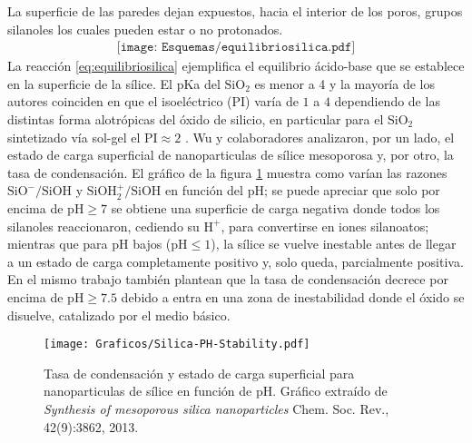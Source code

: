 	La superficie de las paredes dejan expuestos, hacia el interior de los poros, grupos silanoles los cuales pueden estar o no protonados.\cite{Brinker1990,Soler-Illia2011} 
			\begin{equation}
				\begin{aligned}
				\texttt{[image: Esquemas/equilibriosilica.pdf]}
				\label{eq:equilibriosilica}
				\end{aligned}
				\end{equation}
	La reacción \ref{eq:equilibriosilica} ejemplifica el equilibrio ácido-base que se establece en la superficie de la sílice. El pKa del $\text{SiO}_2$ es menor a 4 y la mayoría de los autores coinciden en que el isoeléctrico (PI) varía de $1$ a $4$ dependiendo de  las distintas forma alotrópicas del óxido de silicio, en particular para el SiO$_2$ sintetizado vía sol-gel el $\text{PI}\approx 2$ \cite{Kosmulski2002,Kosmulski2014,Schwarz1984,Si-HanWu2013}.
	Wu y colaboradores\cite{Si-HanWu2013} analizaron, por un lado, el estado de carga superficial de nanoparticulas de sílice mesoporosa y, por otro, la tasa de condensación. El gráfico de la figura \ref{fig:silica_ph} muestra como varían las razones  $\text{SiO}^{-}/\text{SiOH}$ y $\text{SiOH}_2^{+}/\text{SiOH}$ en función del pH; se puede apreciar que solo por encima de $\text{pH}\geq7$ se obtiene una superficie de carga negativa donde todos los silanoles reaccionaron, cediendo su $\text{H}^{+}$, para convertirse en iones silanoatos; mientras que para pH bajos ($\text{pH}\leq1$), la sílice se vuelve inestable antes de llegar a un estado de carga completamente positivo y, solo queda, parcialmente positiva. En el mismo trabajo\cite{Si-HanWu2013} también plantean que la tasa de condensación decrece por encima de $\text{pH}\geq7.5$ debido a entra en una zona de inestabilidad donde el óxido se disuelve, catalizado por el medio básico.
			\begin{figure}[th!]
			\centering
 	       	\texttt{[image: Graficos/Silica-PH-Stability.pdf]}
	       		\caption[Tasa de condensación y estado de carga superficial]{Tasa de condensación y estado de carga superficial para nanoparticulas de sílice en función de pH. Gráfico extraído de \textit{Synthesis of mesoporous silica nanoparticles} Chem. Soc. Rev., 42(9):3862, 2013.\cite{Si-HanWu2013}}
	         	\label{fig:silica_ph}
	     		\end{figure}
			
